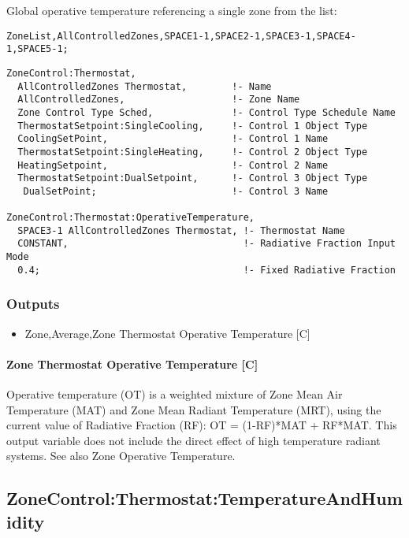 Global operative temperature referencing a single zone from the list:

\begin{lstlisting}
ZoneList,AllControlledZones,SPACE1-1,SPACE2-1,SPACE3-1,SPACE4-1,SPACE5-1;
\end{lstlisting}

\begin{lstlisting}
ZoneControl:Thermostat,
  AllControlledZones Thermostat,        !- Name
  AllControlledZones,                   !- Zone Name
  Zone Control Type Sched,              !- Control Type Schedule Name
  ThermostatSetpoint:SingleCooling,     !- Control 1 Object Type
  CoolingSetPoint,                      !- Control 1 Name
  ThermostatSetpoint:SingleHeating,     !- Control 2 Object Type
  HeatingSetpoint,                      !- Control 2 Name
  ThermostatSetpoint:DualSetpoint,      !- Control 3 Object Type
   DualSetPoint;                        !- Control 3 Name

ZoneControl:Thermostat:OperativeTemperature,
  SPACE3-1 AllControlledZones Thermostat, !- Thermostat Name
  CONSTANT,                               !- Radiative Fraction Input Mode
  0.4;                                    !- Fixed Radiative Fraction
\end{lstlisting}

\subsubsection{Outputs}\label{outputs-1-032}

\begin{itemize}
\tightlist
\item
  Zone,Average,Zone Thermostat Operative Temperature {[}C{]}
\end{itemize}

\paragraph{Zone Thermostat Operative Temperature {[}C{]}}\label{zone-thermostat-operative-temperature-c}

Operative temperature (OT) is a weighted mixture of Zone Mean Air Temperature (MAT) and Zone Mean Radiant Temperature (MRT), using the current value of Radiative Fraction (RF): OT = (1-RF)*MAT + RF*MAT. This output variable does not include the direct effect of high temperature radiant systems. See also Zone Operative Temperature.

\subsection{ZoneControl:Thermostat:TemperatureAndHumidity}\label{zonecontrolthermostattemperatureandhumidity}

